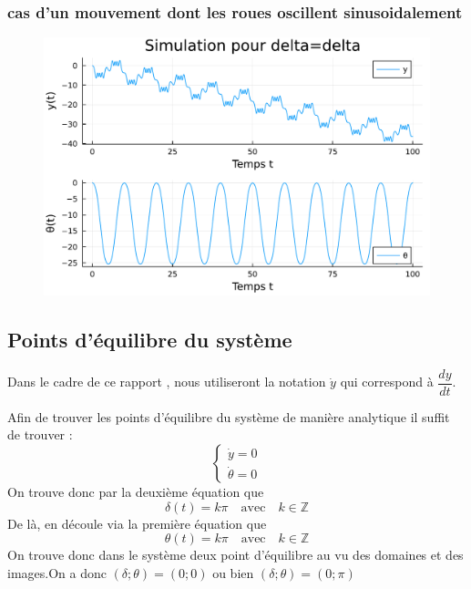 \documentclass[11pt,a4paper]{article}
\begin{document}
\subsubsection{cas d'un mouvement dont les roues oscillent sinusoidalement}
\begin{figure}[!h]
	\centering
	\includegraphics[width=0.5\linewidth]{jlplots/Q1_3_delta.pdf}
\end{figure}
\subsection{Points d'équilibre du système}
\begin{displayquote}
Dans le cadre de ce rapport , nous utiliseront la notation $\dot y$ qui correspond à $\dfrac{d y}{dt}$.
\end{displayquote}
Afin de trouver les points d'équilibre du système de manière analytique il suffit de trouver :
\begin{equation}
	\begin{cases}
		\dot y=0 \\
		\dot \theta=0%
	\end{cases}
\end{equation}
On trouve donc par la deuxième équation que
$$\delta(t) = k\pi \quad \text{avec} \quad k \in \mathbb{Z}$$
De là, en découle via la première équation que
$$\theta(t)=k\pi \quad \text{avec} \quad k \in \mathbb{Z}$$
On trouve donc dans le système deux point d'équilibre au vu des domaines et des images.On a donc $(\delta;\theta)=(0;0)$ ou bien $(\delta;\theta)=(0;\pi)$
\end{document}
